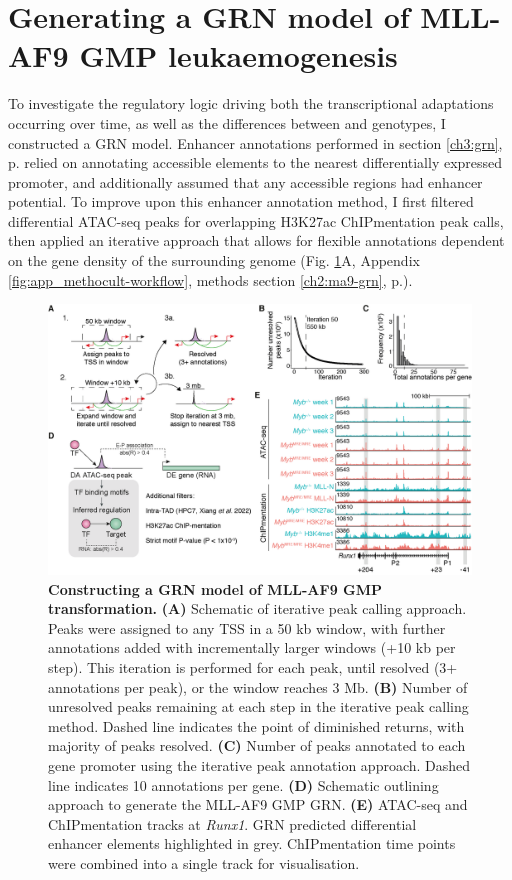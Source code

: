 \section{\label{ch5:grn}Generating a GRN model of MLL-AF9 GMP leukaemogenesis}

To investigate the regulatory logic driving both the transcriptional adaptations occurring over time, as well as the differences between \mybwt{} and \mybmre{} genotypes, I constructed a GRN model. Enhancer annotations performed in section \ref{ch3:grn}, p.\pageref{ch3:grn} relied on annotating accessible elements to the nearest differentially expressed promoter, and additionally assumed that any accessible regions had enhancer potential. To improve upon this enhancer annotation method, I first filtered differential ATAC-seq peaks for overlapping H3K27ac ChIPmentation peak calls, then applied an iterative approach that allows for flexible annotations dependent on the gene density of the surrounding genome (Fig. \ref{fig:ch5_gmp-grn}A, Appendix \ref{fig:app_methocult-workflow}, methods section \ref{ch2:ma9-grn}, p.\pageref{ch2:ma9-grn}). 

\begin{figure}[!t]
    \centering
    \includegraphics[width=\textwidth,height=\textheight,keepaspectratio]{figures/chapter5/ch5_gmp-grn.png}
    \caption[{Constructing a GRN model of MLL-AF9 GMP transformation.}]
    {\textbf{Constructing a GRN model of MLL-AF9 GMP transformation.}
    \textbf{(A)} Schematic of iterative peak calling approach. Peaks were assigned to any TSS in a 50 kb window, with further annotations added with incrementally larger windows (+10 kb per step). This iteration is performed for each peak, until resolved (3+ annotations per peak), or the window reaches 3 Mb. 
    \textbf{(B)} Number of unresolved peaks remaining at each step in the iterative peak calling method. Dashed line indicates the point of diminished returns, with majority of peaks resolved. 
    \textbf{(C)} Number of peaks annotated to each gene promoter using the iterative peak annotation approach. Dashed line indicates 10 annotations per gene.
    \textbf{(D)} Schematic outlining approach to generate the MLL-AF9 GMP GRN.
    \textbf{(E)} ATAC-seq and ChIPmentation tracks at \textit{Runx1}. GRN predicted differential enhancer elements highlighted in grey. ChIPmentation time points were combined into a single track for visualisation.
    }
    \label{fig:ch5_gmp-grn}
\end{figure}

